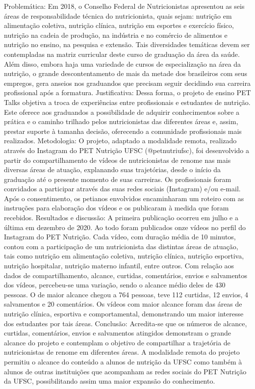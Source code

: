 Problemática: Em 2018, o Conselho Federal de Nutricionistas apresentou as seis áreas de
responsabilidade técnica do nutricionista, quais sejam: nutrição em alimentação coletiva,
nutrição clínica, nutrição em esportes e exercício físico, nutrição na cadeia de produção, na
indústria e no comércio de alimentos e nutrição no ensino, na pesquisa e extensão. Tais
diversidades temáticas devem ser contempladas na matriz curricular deste curso de graduação da
área da saúde. Além disso, embora haja uma variedade de cursos de especialização na área da
nutrição, o grande descontentamento de mais da metade dos brasileiros com seus empregos, gera
anseios nos graduandos que precisam seguir decidindo sua carreira profissional após a formatura.
Justificativa: Dessa forma, o projeto de ensino PET Talks objetiva a troca de experiências entre
profissionais e estudantes de nutrição. Este oferece aos graduandos a possibilidade de adquirir
conhecimentos sobre a prática e o caminho trilhado pelos nutricionistas das diferentes áreas e,
assim, prestar suporte à tamanha decisão, oferecendo a comunidade profissionais mais
realizados. Metodologia: O projeto, adaptado a modalidade remota, realizado através do
Instagram do PET Nutrição UFSC (@petnutriufsc), foi desenvolvido a partir do
compartilhamento de vídeos de nutricionistas de renome nas mais diversas áreas de atuação,
explanando suas trajetórias, desde o início da graduação até o presente momento de suas
carreiras. Os profissionais foram convidados a participar através das suas redes sociais
(Instagram) e/ou e-mail. Após o consentimento, os petianos envolvidos encaminharam um
roteiro com as instruções para elaboração dos vídeos e os publicaram à medida que foram
recebidos. Resultados e discussão: A primeira publicação ocorreu em julho e a última em
dezembro de 2020. Ao todo foram publicados onze vídeos no perfil do Instagram do PET
Nutrição. Cada vídeo, com duração média de 10 minutos, contou com a participação de um
nutricionista das distintas áreas de atuação, tais como nutrição em alimentação coletiva, nutrição
clínica, nutrição esportiva, nutrição hospitalar, nutrição materno infantil, entre outros. Com
relação aos dados de compartilhamento, alcance, curtidas, comentários, envios e salvamentos dos
vídeos, percebeu-se uma variação, sendo o alcance médio deles de 430 pessoas. O de maior
alcance chegou a 764 pessoas, teve 112 curtidas, 12 envios, 4 salvamentos e 20 comentários. Os
vídeos com maior alcance foram das áreas de nutrição clínica, esportiva e comportamental,
demonstrando um maior interesse dos estudantes por tais áreas. Conclusão: Acredita-se que os
números de alcance, curtidas, comentários, envios e salvamentos atingidos demonstram o grande
alcance do projeto e contemplam o objetivo de compartilhar a trajetória de nutricionistas de
renome em diferentes áreas. A modalidade remota do projeto permitiu o alcance do conteúdo a
alunos de nutrição da UFSC como também à alunos de outras instituições que acompanham as
redes sociais do PET Nutrição da UFSC, possibilitando assim uma maior expansão do
conhecimento.

